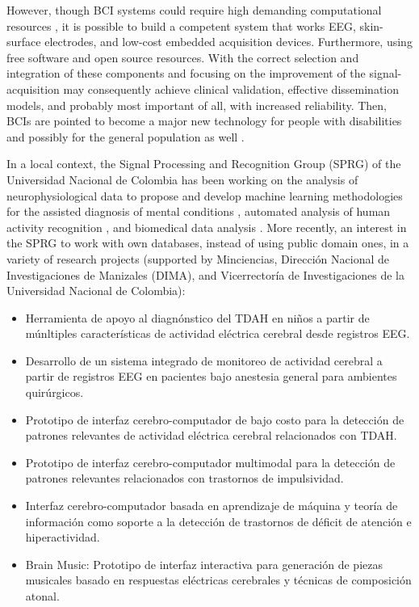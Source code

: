 However, though \gls*{BCI} systems could require high demanding computational resources \cite{kostiukevych2021convolutional}, it is possible to build a competent system that works \gls*{EEG}, skin-surface electrodes, and low-cost embedded acquisition devices. Furthermore, using free software and open source resources. With the correct selection and integration of these components and focusing on the improvement of the signal-acquisition may consequently achieve clinical validation, effective dissemination models, and probably most important of all, with increased reliability. Then, \gls*{BCI}s are pointed to become a major new technology for people with disabilities and possibly for the general population as well \cite{wolpaw2012brain}.

In a local context, the Signal Processing and Recognition Group (SPRG) of the Universidad Nacional de Colombia has been working on the analysis of neurophysiological data to propose and develop machine learning methodologies for the assisted diagnosis of mental conditions \cite{cardenas2017enhanced, collazos2019instance}, automated analysis of human activity recognition \cite{pulgarin2017relevant}, and biomedical data analysis \cite{hurtado2016identification}. More recently, an interest in the SPRG to work with own databases, instead of using public domain ones, in a variety of research projects (supported by Minciencias, Dirección Nacional de Investigaciones de Manizales (DIMA), and Vicerrectoría de Investigaciones de la Universidad Nacional de Colombia):

    

\begin{itemize}

    \item Herramienta de apoyo al diagnónstico del TDAH en niños a partir de múnltiples características de actividad eléctrica cerebral desde registros \gls*{EEG}.

    \item Desarrollo de un sistema integrado de monitoreo de actividad cerebral a partir de registros \gls*{EEG} en pacientes bajo anestesia general para ambientes quirúrgicos.

    \item Prototipo de interfaz cerebro-computador de bajo costo para la detección de patrones relevantes de actividad eléctrica cerebral relacionados con TDAH.

    \item Prototipo de interfaz cerebro-computador multimodal para la detección de patrones relevantes relacionados con trastornos de impulsividad.

    \item Interfaz cerebro-computador basada en aprendizaje de máquina y teoría de información como soporte a la detección de trastornos de déficit de atención e hiperactividad.

    \item Brain Music: Prototipo de interfaz interactiva para generación de piezas musicales basado en respuestas eléctricas cerebrales y técnicas de composición atonal.

\end{itemize}


